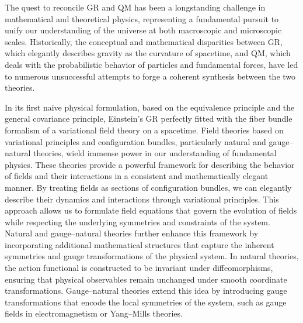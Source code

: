 The quest to reconcile GR and QM has been a longstanding challenge in mathematical and theoretical physics, representing a fundamental pursuit to unify our understanding of the universe at both macroscopic and microscopic scales. Historically, the conceptual and mathematical disparities between GR, which elegantly describes gravity as the curvature of spacetime, and QM, which deals with the probabilistic behavior of particles and fundamental forces, have led to numerous unsuccessful attempts to forge a coherent synthesis between the two theories.

In its first naive physical formulation, based on the equivalence principle and the general covariance principle, Einstein's GR perfectly fitted with the fiber bundle formalism of a variational field theory on a spacetime. Field theories based on variational principles and configuration bundles, particularly natural and gauge--natural theories, wield immense power in our understanding of fundamental physics. These theories provide a powerful framework for describing the behavior of fields and their interactions in a consistent and mathematically elegant manner. By treating fields as sections of configuration bundles, we can elegantly describe their dynamics and interactions through variational principles. This approach allows us to formulate field equations that govern the evolution of fields while respecting the underlying symmetries and constraints of the system. Natural and gauge--natural theories further enhance this framework by incorporating additional mathematical structures that capture the inherent symmetries and gauge transformations of the physical system. In natural theories, the action functional is constructed to be invariant under diffeomorphisms, ensuring that physical observables remain unchanged under smooth coordinate transformations. Gauge--natural theories extend this idea by introducing gauge transformations that encode the local symmetries of the system, such as gauge fields in electromagnetism or Yang--Mills theories. 

